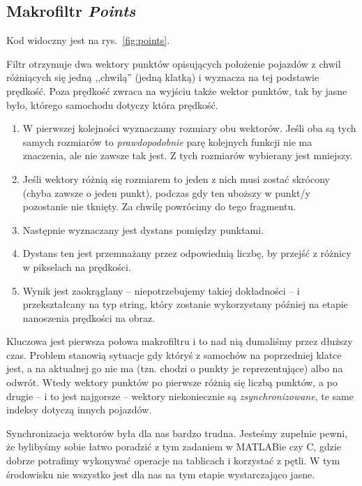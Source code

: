\documentclass[11pt, a4paper]{article}
\begin{document}
\subsection*{Makrofiltr \emph{Points}}

Kod widoczny jest na rys.~\ref{fig:points}.

Filtr otrzymuje dwa wektory punktów opisujących położenie pojazdów z chwil różniących się jedną ,,chwilą'' (jedną klatką) i wyznacza na tej podstawie prędkość. Poza prędkość zwraca na wyjściu także wektor punktów, tak by jasne było, którego samochodu dotyczy która prędkość.

\begin{enumerate}
\item W pierwszej kolejności wyznaczamy rozmiary obu wektorów. Jeśli oba są tych samych rozmiarów to \emph{prawdopodobnie} parę kolejnych funkcji nie ma znaczenia, ale nie zawsze tak jest. Z tych rozmiarów wybierany jest mniejszy.
\item Jeśli wektory różnią się rozmiarem to jeden z nich musi zostać skrócony (chyba zawsze o jeden punkt), podczas gdy ten uboższy w punkt/y pozostanie nie tknięty. Za chwilę powrócimy do tego fragmentu.
\item Następnie wyznaczany jest dystans pomiędzy punktami.
\item Dystans ten jest przemnażany przez odpowiednią liczbę, by przejść z różnicy w pikselach na prędkości.
\item Wynik jest zaokrąglany -- niepotrzebujemy takiej dokładności -- i przekształcany na typ string, który zostanie wykorzystany później na etapie nanoszenia prędkości na obraz.
\end{enumerate}

Kluczowa jest pierwsza połowa makrofiltru i to nad nią dumaliśmy przez dłuższy czas. Problem stanowią sytuacje gdy któryś z samochów na poprzedniej klatce jest, a na aktualnej go nie ma (tzn. chodzi o punkty je reprezentujące) albo na odwrót. Wtedy wektory punktów po pierwsze różnią się liczbą punktów, a po drugie -- i to jest najgorsze -- wektory niekoniecznie są \emph{zsynchronizowane}, te same indeksy dotyczą innych pojazdów.

Synchronizacja wektorów była dla nas bardzo trudna. Jesteśmy zupełnie pewni, że bylibyśmy sobie łatwo poradzić z tym zadaniem w MATLABie czy C, gdzie dobrze potrafimy wykonywać operacje na tablicach i korzystać z pętli. W tym środowisku nie wszystko jest dla nas na tym etapie wystarczająco jasne.
\end{document}

